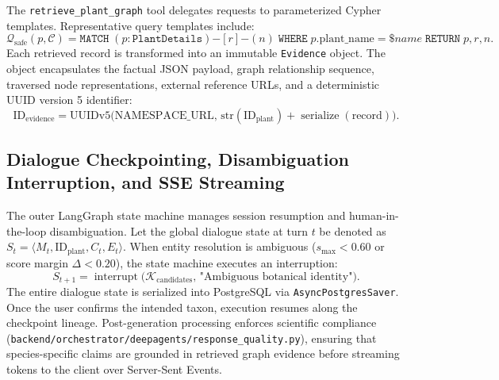 The \texttt{retrieve\_plant\_graph} tool delegates requests to parameterized Cypher templates. Representative query templates include:
\begin{equation}
\mathcal{Q}_{\mathrm{safe}}(p, \mathcal{C}) = \mathtt{MATCH}\;(p\mathtt{:PlantDetails})\mathtt{-}[r]\mathtt{-}(n)\;\mathtt{WHERE}\;p.\mathrm{plant\_name} = \$name\;\mathtt{RETURN}\;p, r, n.
\label{eq:cypher_template}
\end{equation}
Each retrieved record is transformed into an immutable \texttt{Evidence} object. The object encapsulates the factual JSON payload, graph relationship sequence, traversed node representations, external reference URLs, and a deterministic UUID version 5 identifier:
\begin{equation}
\mathrm{ID}_{\mathrm{evidence}} = \mathrm{UUIDv5}\Big(\mathrm{NAMESPACE\_URL},\, \mathrm{str}(\mathrm{ID}_{\mathrm{plant}}) + \operatorname{serialize}(\mathrm{record})\Big).
\label{eq:uuid_evidence}
\end{equation}

\subsection{Dialogue Checkpointing, Disambiguation Interruption, and SSE Streaming}

The outer LangGraph state machine manages session resumption and human-in-the-loop disambiguation. Let the global dialogue state at turn $t$ be denoted as $S_t = \langle M_t, \mathrm{ID}_{\mathrm{plant}}, C_t, E_t \rangle$. When entity resolution is ambiguous ($s_{\max} < 0.60$ or score margin $\Delta < 0.20$), the state machine executes an interruption:
\begin{equation}
S_{t+1} = \operatorname{interrupt}\Big(\mathcal{K}_{\mathrm{candidates}},\, \text{"Ambiguous botanical identity"}\Big).
\label{eq:interrupt}
\end{equation}
The entire dialogue state is serialized into PostgreSQL via \texttt{AsyncPostgresSaver}. Once the user confirms the intended taxon, execution resumes along the checkpoint lineage. Post-generation processing enforces scientific compliance (\texttt{backend/\allowbreak orchestrator/\allowbreak deepagents/\allowbreak response\_quality.py}), ensuring that species-specific claims are grounded in retrieved graph evidence before streaming tokens to the client over Server-Sent Events.
